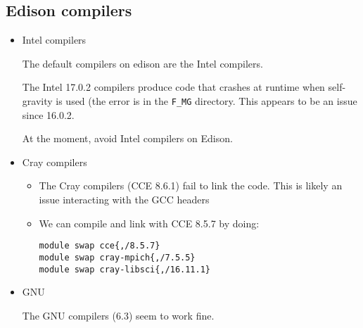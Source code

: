

\subsection{Edison compilers}

\begin{itemize}
\item Intel compilers

  The default compilers on edison are the Intel compilers.  

  The Intel 17.0.2 compilers produce code that crashes at runtime when self-gravity
  is used (the error is in the {\tt F\_MG} directory.  This appears to be an issue since
  16.0.2.

  At the moment, avoid Intel compilers on Edison.


\item Cray compilers

  \begin{itemize}
    \item The Cray compilers (CCE 8.6.1) fail to link the code.  This
      is likely an issue interacting with the GCC headers

    \item We can compile and link with CCE 8.5.7 by doing:
      \begin{verbatim}
module swap cce{,/8.5.7}
module swap cray-mpich{,/7.5.5}
module swap cray-libsci{,/16.11.1}
      \end{verbatim}
   \end{itemize}
\item GNU

  The GNU compilers (6.3) seem to work fine.

\end{itemize}



